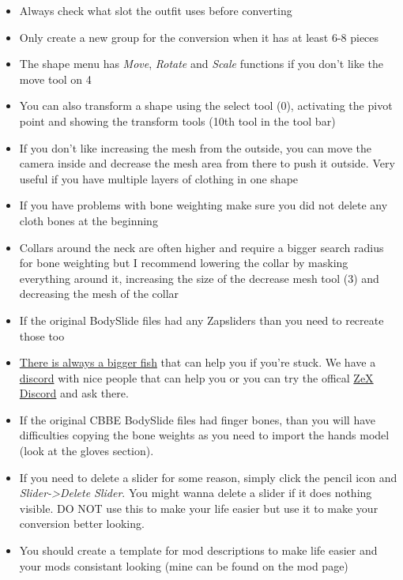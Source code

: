 \begin{itemize}
    \item Always check what slot the outfit uses before converting
    \item Only create a new group for the conversion when it has at least 6-8 pieces
    \item The shape menu has \textit{Move}, \textit{Rotate} and \textit{Scale} functions if you don't like the move tool on 4
    \item You can also transform a shape using the select tool (0), activating the pivot point and showing the transform tools 
    (10th tool in the tool bar)
    \item If you don't like increasing the mesh from the outside, you can move the camera inside and decrease the mesh area from there 
    to push it outside. Very useful if you have multiple layers of clothing in one shape
    \item If you have problems with bone weighting make sure you did not delete any cloth bones at the beginning
    \item Collars around the neck are often higher and require a bigger search radius for bone weighting but I recommend lowering the 
    collar by masking everything around it, increasing the size of the decrease mesh tool (3) and decreasing the mesh of the collar
    \item If the original BodySlide files had any Zapsliders than you need to recreate those too
    \item \href{https://www.youtube.com/watch?v=IIQVAShJzLo&t=1m15s}{There is always a bigger fish} that can help you if you're stuck.
    We have a \href{https://discord.gg/JakcQPN}{discord} with nice people that can help you or you can try the offical 
    \href{https://discord.gg/PNqYQpG}{ZeX Discord} and ask there.
    \item If the original CBBE BodySlide files had finger bones, than you will have difficulties copying the bone weights as you 
    need to import the hands model (look at the gloves section).
    \item If you need to delete a slider for some reason, simply click the pencil icon and \textit{Slider->Delete Slider}. You might wanna 
    delete a slider if it does nothing visible. DO NOT use this to make your life easier but use it to make your conversion better looking. 
    \item You should create a template for mod descriptions to make life easier and your mods consistant looking (mine can be found on the mod page)

\end{itemize}

